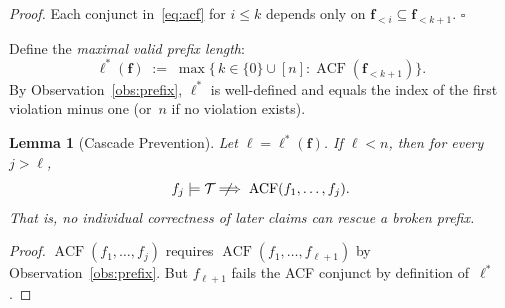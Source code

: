 \documentclass{uai2026} %
\theoremstyle{remark}
\theoremstyle{plain}
\newtheorem{lemma}[theorem]{Lemma}
\theoremstyle{definition}
\begin{document}
\noindent
\emph{Proof.}
Each conjunct in~\eqref{eq:acf} for $i\le k$ depends
only on $\bm{f}_{<i}\subseteq\bm{f}_{<k+1}$.
\hfill$\square$

\medskip
Define the \emph{maximal valid prefix length}:
\begin{equation}\label{eq:mvp}
  \ell^{*}(\bm{f})
  \;:=\;
  \max\bigl\{\,k\in\{0\}\cup[n]
  :\operatorname{ACF}(\bm{f}_{<k+1})\bigr\}.
\end{equation}
By Observation~\ref{obs:prefix}, $\ell^{*}$ is well-defined
and equals the index of the first violation minus one
(or~$n$ if no violation exists).

\begin{lemma}[Cascade Prevention]
\label{lem:cascade}
Let $\ell=\ell^{*}(\bm{f})$.
If $\ell<n$, then for every $j>\ell$,
\begin{equation}\label{eq:cascade}
  f_{j}\models\mathcal{T}
  \;\not\!\!\Longrightarrow\;
  \operatorname{ACF}(f_{1},\dots,f_{j}).
\end{equation}
That is, no individual correctness of later claims can
rescue a broken prefix.
\end{lemma}

\begin{proof}
$\operatorname{ACF}(f_{1},\dots,f_{j})$ requires
$\operatorname{ACF}(f_{1},\dots,f_{\ell+1})$ by
Observation~\ref{obs:prefix}.  But $f_{\ell+1}$ fails
the ACF conjunct by definition of~$\ell^{*}$.
\end{proof}
\end{document}
